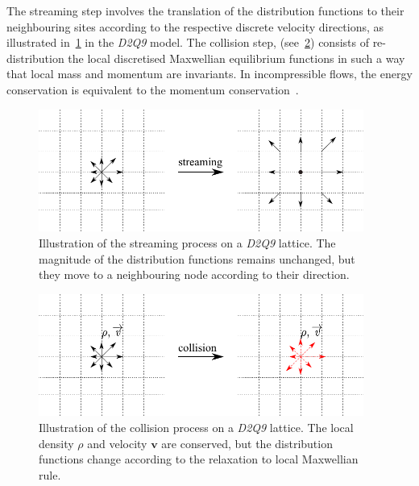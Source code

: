 The streaming step involves the translation of the distribution 
functions to their neighbouring sites according to the 
respective discrete velocity directions, as illustrated 
in~\cref{fig:stream} in the \textit{D2Q9} model. The collision 
step, (see~\cref{fig:collision}) consists of 
re-distribution the local 
discretised Maxwellian equilibrium functions in such a way that 
local mass and momentum are invariants. In incompressible 
flows, the energy conservation is equivalent to the momentum 
conservation~\citep{He1997}.

\begin{figure}[htbp]
	\centering
	\includegraphics[width=0.95\textwidth]{stream}
	\caption[Illustration of the streaming process on a \textit{D2Q9} 
	lattice]{Illustration of the streaming process on a \textit{D2Q9} lattice. 
	The magnitude of the distribution functions remains unchanged, but they 
	move to a neighbouring node according to their direction.}
	\label{fig:stream}
\end{figure}

\begin{figure}[htbp]
	\centering
	\includegraphics[width=0.95\textwidth]{collision}
	\caption[Illustration of the collision process on a \textit{D2Q9} 
	lattice]{Illustration of the collision process on a \textit{D2Q9} lattice. 
	The local density $\rho$ and velocity $\mathbf{v}$ are conserved, but the 
	distribution functions change according to the relaxation to local 
	Maxwellian rule.}
	\label{fig:collision}
\end{figure} 

